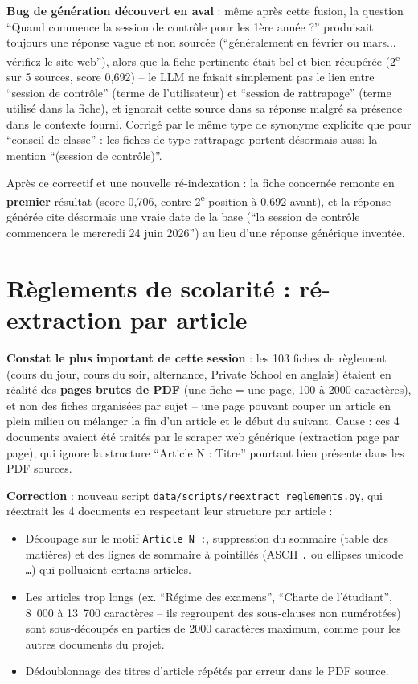 \documentclass[11pt,a4paper]{report}
\begin{document}
\begin{statutlimite}
\textbf{Bug de génération découvert en aval} : même après cette fusion, la question
``Quand commence la session de contrôle pour les 1ère année ?'' produisait toujours une
réponse vague et non sourcée (``généralement en février ou mars... vérifiez le site
web''), alors que la fiche pertinente était bel et bien récupérée (2\textsuperscript{e}
sur 5 sources, score 0{,}692) -- le LLM ne faisait simplement pas le lien entre
``session de contrôle'' (terme de l'utilisateur) et ``session de rattrapage'' (terme
utilisé dans la fiche), et ignorait cette source dans sa réponse malgré sa présence dans
le contexte fourni. Corrigé par le même type de synonyme explicite que pour ``conseil de
classe'' : les fiches de type rattrapage portent désormais aussi la mention ``(session
de contrôle)''.
\end{statutlimite}

\begin{statutfait}
Après ce correctif et une nouvelle ré-indexation : la fiche concernée remonte en
\textbf{premier} résultat (score 0{,}706, contre 2\textsuperscript{e} position à 0{,}692
avant), et la réponse générée cite désormais une vraie date de la base (``la session de
contrôle commencera le mercredi 24 juin 2026'') au lieu d'une réponse générique inventée.
\end{statutfait}

\section{Règlements de scolarité : ré-extraction par article}
\textbf{Constat le plus important de cette session} : les 103 fiches de règlement
(cours du jour, cours du soir, alternance, Private School en anglais) étaient en réalité
des \textbf{pages brutes de PDF} (une fiche = une page, 100 à 2000 caractères), et non
des fiches organisées par sujet -- une page pouvant couper un article en plein milieu
ou mélanger la fin d'un article et le début du suivant. Cause : ces 4 documents avaient
été traités par le scraper web générique (extraction page par page), qui ignore la
structure ``Article N : Titre'' pourtant bien présente dans les PDF sources.

\textbf{Correction} : nouveau script \texttt{data/scripts/reextract\_reglements.py},
qui réextrait les 4 documents en respectant leur structure par article :
\begin{itemize}
    \item Découpage sur le motif \texttt{Article N :}, suppression du sommaire (table
    des matières) et des lignes de sommaire à pointillés (ASCII \texttt{.} ou ellipses
    unicode \texttt{…}) qui polluaient certains articles.
    \item Les articles trop longs (ex. ``Régime des examens'', ``Charte de l'étudiant'',
    8~000 à 13~700 caractères -- ils regroupent des sous-clauses non numérotées) sont
    sous-découpés en parties de 2000 caractères maximum, comme pour les autres documents
    du projet.
    \item Dédoublonnage des titres d'article répétés par erreur dans le PDF source.
\end{itemize}
\end{document}
